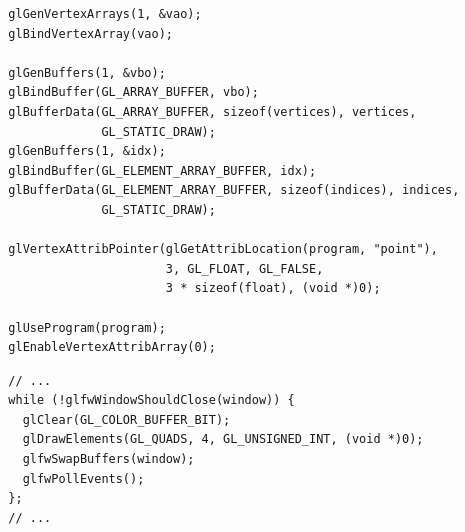 \documentclass[calcdimensions,landscape,letterpaper]{powersem}
\newcommand{\thecurrentheading}{}
\newcommand{\heading}[1]{\renewcommand{\thecurrentheading}{#1}}
\begin{document}
\begin{slide}
    \heading{Vertex Array Object}
    \begin{center}
        \begin{minipage}[c]{.95\textwidth}
            \begin{verbatim}
  glGenVertexArrays(1, &vao);
  glBindVertexArray(vao);

  glGenBuffers(1, &vbo);
  glBindBuffer(GL_ARRAY_BUFFER, vbo);
  glBufferData(GL_ARRAY_BUFFER, sizeof(vertices), vertices,
               GL_STATIC_DRAW);
  glGenBuffers(1, &idx);
  glBindBuffer(GL_ELEMENT_ARRAY_BUFFER, idx);
  glBufferData(GL_ELEMENT_ARRAY_BUFFER, sizeof(indices), indices,
               GL_STATIC_DRAW);

  glVertexAttribPointer(glGetAttribLocation(program, "point"),
                        3, GL_FLOAT, GL_FALSE,
                        3 * sizeof(float), (void *)0);

  glUseProgram(program);
  glEnableVertexAttribArray(0);
            \end{verbatim}
        \end{minipage}
    \end{center}
\end{slide}

\begin{slide}
    \heading{Render Quads}
    \begin{center}
        \begin{minipage}[c]{.95\textwidth}
            \begin{verbatim}
  // ...
  while (!glfwWindowShouldClose(window)) {
    glClear(GL_COLOR_BUFFER_BIT);
    glDrawElements(GL_QUADS, 4, GL_UNSIGNED_INT, (void *)0);
    glfwSwapBuffers(window);
    glfwPollEvents();
  };
  // ...
            \end{verbatim}
        \end{minipage}
    \end{center}
\end{slide}
\end{document}
